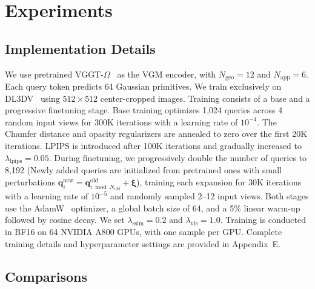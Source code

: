\documentclass[letterpaper]{article} %
\begin{document}
\section{Experiments}
\label{sec:experiments}


\subsection{Implementation Details}
\label{sec:imple_details}

We use pretrained VGGT-$\Omega$~\cite{wang2026vggtomega} as the VGM encoder, with $N_{\mathrm{geo}}=12$ and $N_{\mathrm{app}}=6$. Each query token predicts 64 Gaussian primitives. We train exclusively on DL3DV~\cite{ling2024dl3dv} using $512 \times 512$ center-cropped images. Training consists of a base and a progressive finetuning stage. Base training optimizes 1,024 queries across 4 random input views for 300K iterations with a learning rate of $10^{-4}$. The Chamfer distance and opacity regularizers are annealed to zero over the first 20K iterations. LPIPS is introduced after 100K iterations and gradually increased to $\lambda_{\mathrm{lpips}}=0.05$. During finetuning, we progressively double the number of queries to 8,192 (Newly added queries are initialized from pretrained ones with small perturbations $\mathbf{q}^{\mathrm{new}}_i=\mathbf{q}^{\mathrm{old}}_{i\bmod N_{\mathrm{old}}}+\boldsymbol{\xi}$), training each expansion for 30K iterations with a learning rate of $10^{-5}$ and randomly sampled 2--12 input views. Both stages use the AdamW~\cite{loshchilov2019adamw} optimizer, a global batch size of 64, and a 5\% linear warm-up followed by cosine decay. We set $\lambda_{\mathrm{ssim}}=0.2$ and $\lambda_{\mathrm{vis}}=1.0$. Training is conducted in BF16 on 64 NVIDIA A800 GPUs, with one sample per GPU. Complete training details and hyperparameter settings are provided in Appendix~E.









\subsection{Comparisons}
\label{sec:comparisons}
\end{document}
